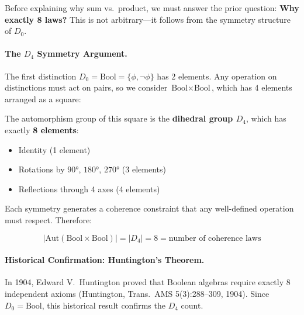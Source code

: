 \documentclass[11pt,a4paper]{book}
\begin{document}
Before explaining why sum vs.\ product, we must answer the prior question:
\textbf{Why exactly 8 laws?} This is not arbitrary---it follows from the 
symmetry structure of $D_0$.

\paragraph{The $D_4$ Symmetry Argument.}

The first distinction $D_0 = \text{Bool} = \{\phi, \neg\phi\}$ has 2 elements.
Any operation on distinctions must act on pairs, so we consider 
$\text{Bool} \times \text{Bool}$, which has 4 elements arranged as a square:

\begin{center}
\end{center}

The automorphism group of this square is the \textbf{dihedral group $D_4$}, 
which has exactly \textbf{8 elements}:
\begin{itemize}
\item Identity (1 element)
\item Rotations by $90°$, $180°$, $270°$ (3 elements)
\item Reflections through 4 axes (4 elements)
\end{itemize}

Each symmetry generates a coherence constraint that any well-defined 
operation must respect. Therefore:

$$|\text{Aut}(\text{Bool} \times \text{Bool})| = |D_4| = 8 = \text{number of coherence laws}$$

\paragraph{Historical Confirmation: Huntington's Theorem.}

In 1904, Edward V.\ Huntington proved that Boolean algebras require exactly 
8 independent axioms (Huntington, Trans.\ AMS 5(3):288--309, 1904). Since 
$D_0 = \text{Bool}$, this historical result confirms the $D_4$ count.
\end{document}
